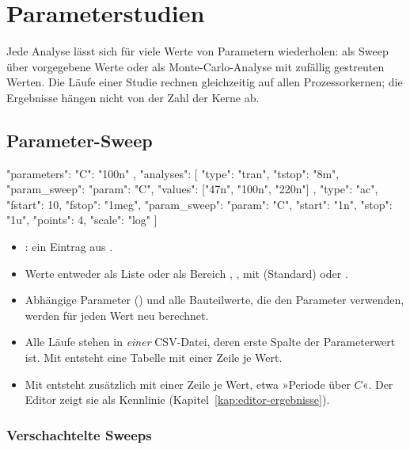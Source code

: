 \chapter{Parameterstudien}
\label{kap:format-studien}

Jede Analyse lässt sich für viele Werte von Parametern wiederholen: als
Sweep über vorgegebene Werte oder als Monte-Carlo-Analyse mit zufällig
gestreuten Werten. Die Läufe einer Studie rechnen gleichzeitig auf allen
Prozessorkernen; die Ergebnisse hängen nicht von der Zahl der Kerne ab.

\section{Parameter-Sweep}

\begin{json}
"parameters": { "C": "100n" },
"analyses": [
  { "type": "tran", "tstop": "8m",
    "param_sweep": { "param": "C", "values": ["47n", "100n", "220n"] } },
  { "type": "ac", "fstart": 10, "fstop": "1meg",
    "param_sweep": { "param": "C", "start": "1n", "stop": "1u", "points": 4, "scale": "log" } }
]
\end{json}

\begin{itemize}
  \item {}: ein Eintrag aus .
  \item Werte entweder als Liste  oder als Bereich
    , ,  mit 
     (Standard) oder .
  \item Abhängige Parameter () und alle Bauteilwerte,
    die den Parameter verwenden, werden für jeden Wert neu berechnet.
  \item Alle Läufe stehen in \emph{einer} CSV-Datei, deren erste Spalte der
    Parameterwert ist. Mit  entsteht eine Tabelle mit einer Zeile
    je Wert.
  \item Mit  entsteht zusätzlich
     mit einer Zeile je Wert, etwa
    »Periode über $C$«. Der Editor zeigt sie als Kennlinie
    (Kapitel~\ref{kap:editor-ergebnisse}).
\end{itemize}

\subsection*{Verschachtelte Sweeps}

